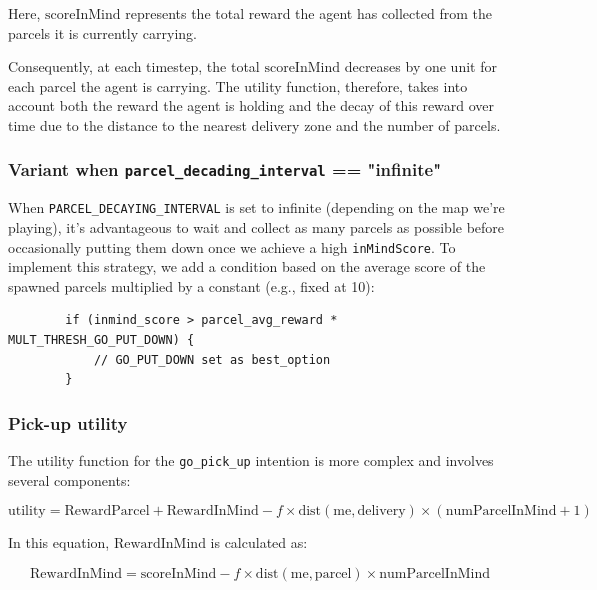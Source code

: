 \documentclass[10pt]{article}
\begin{document}
Here, $\text{scoreInMind}$ represents the total reward the agent has collected from the parcels it is currently carrying. 


Consequently, at each timestep, the total $\text{scoreInMind}$ decreases by one unit for each parcel the agent is carrying. The utility function, therefore, takes into account both the reward the agent is holding and the decay of this reward over time due to the distance to the nearest delivery zone and the number of parcels.

\subsubsection{Variant when \texttt{parcel\_decading\_interval} == "infinite"}

\label{variant_go_put_down}

When \texttt{PARCEL\_DECAYING\_INTERVAL} is set to infinite (depending on the map we're playing), it's advantageous to wait and collect as many parcels as possible before occasionally putting them down once we achieve a high \texttt{inMindScore}. To implement this strategy, we add a condition based on the average score of the spawned parcels multiplied by a constant (e.g., fixed at 10):

\begin{verbatim}
        if (inmind_score > parcel_avg_reward * MULT_THRESH_GO_PUT_DOWN) {
            // GO_PUT_DOWN set as best_option
        }
\end{verbatim}

\subsubsection{Pick-up utility}

The utility function for the \texttt{go\_pick\_up} intention is more complex and involves several components:

\begin{equation}
    \text{utility} = \text{RewardParcel} + \text{RewardInMind} - f \times \text{dist}(\text{me}, \text{delivery}) \times (\text{numParcelInMind} + 1)
\end{equation}

In this equation, $\text{RewardInMind}$ is calculated as:

\begin{equation}
    \text{RewardInMind} = \text{scoreInMind} - f \times \text{dist}(\text{me}, \text{parcel}) \times \text{numParcelInMind}
\end{equation}
\end{document}
